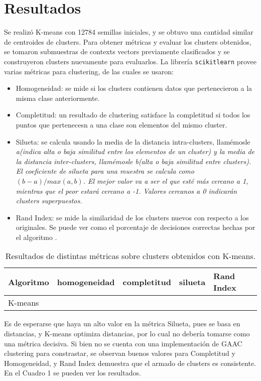 \documentclass[11pt]{article}
\begin{document}
\section{Resultados}
Se realizó K-means con 12784 semillas iniciales, y se obtuvo una cantidad similar de centroides de clusters.
Para obtener métricas y evaluar los clusters obtenidos, se tomaron submuestras de contexts vectors previamente clasificados y se construyeron clusters nuevamente para evaluarlos.
La librería \texttt{scikitlearn} provee varias métricas para clustering, de las cuales se usaron:
\begin{itemize}
\item Homogeneidad: se mide si los clusters contienen datos que pertenecieron a la misma clase anteriormente.
\item Completitud: un resultado de clustering satisface la completitud si todos los puntos que pertenecesn a una clase son elementos del mismo cluster.
\item Silueta: se calcula usando la media de la distancia intra-clusters, llamémosle \em a\em (indica alta o baja similitud entre los elementos de un cluster) y la media de la distancia inter-clusters, llamémosle \em b\em (alta o baja similitud entre clusters). El coeficiente de silueta para una muestra se calcula como $(b-a) / max(a,b)$. El mejor valor va a ser el que esté más cercano a 1, mientras que el peor estará cercano a -1. Valores cercanos a 0 indicarán clusters superpuestos.
\item Rand Index: se mide la similaridad de los clusters nuevos con respecto a los originales. Se puede ver como el porcentaje de decisiones correctas hechas por el algoritmo \cite{WikiClus} \cite{StanClus}.
\end{itemize}
\begin{center}
    \begin{table}[H]\centering\footnotesize
        \begin{tabular}{| l | l | l | l | l | }
        \hline
        Algoritmo & homogeneidad & completitud & silueta & Rand Index \\ \hline
        K-means &  &  &  & \\ \hline
        \end{tabular}
      \caption{Resultados de distintas métricas sobre clusters obtenidos con K-means.}
    \end{table}
\end{center}
Es de esperarse que haya un alto valor en la métrica Silueta, pues se basa en distancias, y K-means optimiza distancias, por lo cual no debería tomarse como una métrica decisiva.
Si bien no se cuenta con una implementación de GAAC clustering para constrastar, se observan buenos valores para Completitud y Homogeneidad, y Rand Index demuestra que el armado de clusters es consistente.
En el Cuadro 1 se pueden ver los resultados.
\end{document}
